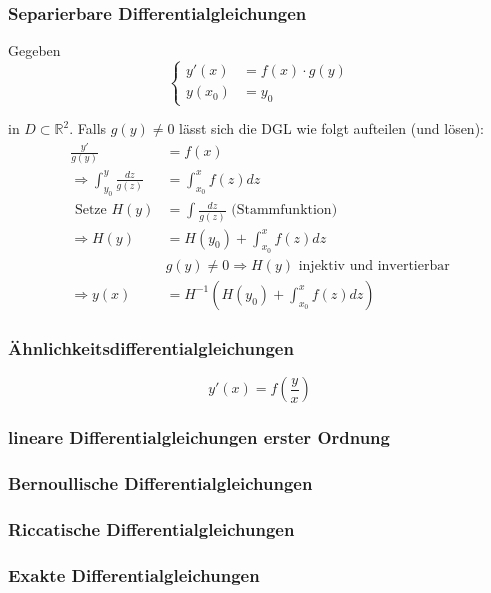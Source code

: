 \documentclass[a4paper]{article}
\newcommand{\R}{\mathbb{R}}
\begin{document}
\subsubsection{Separierbare Differentialgleichungen}
Gegeben
\[
\begin{cases}
	y' (x) & = f(x) \cdot g(y) \\
	y(x_0) &= y_0 
\end{cases}
\] 

in $D \subset \R ^2$. Falls $g(y) \neq 0$
lässt sich die DGL wie folgt aufteilen (und lösen):
\begin{align*}
	\frac{ y' }{ g(y) } &= f(x) \\
	\Rightarrow 
	\int_{y_0}^{y} \frac{ dz }{ g(z) } 
		&= 
		\int_{x_0}^{x} f(z) dz 
	\\
	\text{ Setze } H(y) 
		&= \int \frac{ dz }{ g(z) } 
		\text{ (Stammfunktion) } \\
		\Rightarrow H(y) 
		&= H(y_0)  + \int_{x_0}^{x} f(z) dz \\
		& g(y) \neq 0 \Rightarrow H(y)
		\text{ injektiv und invertierbar}
		\\
	\Rightarrow y(x)
	&= H ^{-1} \left(
		H(y_0) + \int_{x_0}^{x} f(z) dz
	\right)  
\end{align*}

\subsubsection{Ähnlichkeitsdifferentialgleichungen}
\[
	y' (x) = f \left(
		\frac{ y }{ x }
	\right) 
\] 

\subsubsection{lineare Differentialgleichungen erster Ordnung}
\subsubsection{Bernoullische Differentialgleichungen}
\subsubsection{Riccatische Differentialgleichungen}
\subsubsection{Exakte Differentialgleichungen}
\end{document}

